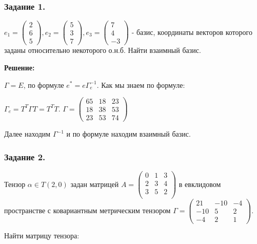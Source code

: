 \subsubsection{Задание 1.}

$e_1 = \begin{pmatrix}
    2 \\
    6\\
    5
\end{pmatrix} ,e_2 =\begin{pmatrix}
    5 \\
    3\\
    7
\end{pmatrix}, e_3 = \begin{pmatrix}
    7 \\
    4\\
    -3
\end{pmatrix}$ - базис, координаты векторов которого заданы относительно некоторого о.н.б. Найти взаимный базис.

\textbf{Решение:}

$\Gamma = E$, по формуле $e^* = e\Gamma_e^{-1}$. Как мы знаем по формуле:

$\Gamma_e = T^T \Gamma T = T^T T$. $\Gamma = \begin{pmatrix}
    65 & 18 & 23\\
    18 & 38 & 53\\
    23 & 53 & 74
\end{pmatrix}$

Далее находим $\Gamma^{-1}$ и по формуле находим взаимный базис.

\subsubsection{Задание 2.}

Тензор $\alpha \in T(2,0)$ задан матрицей $A = \begin{pmatrix}
     0 & 1& 3\\
     2 &3&4\\
     3 &5&2\\
\end{pmatrix}$ в евклидовом пространстве с ковариантным метрическим тензором $\Gamma = \begin{pmatrix}
    21  & -10 & -4\\
    -10 & 5 & 2\\
    -4 & 2 & 1
\end{pmatrix}$.

Найти матрицу тензора:

